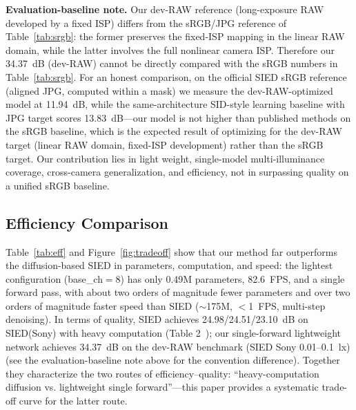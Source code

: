 \documentclass[remotesensing,article,accept,moreauthors]{Definitions/mdpi}
\begin{document}
\textbf{Evaluation-baseline note.} Our dev-RAW reference (long-exposure RAW developed by a fixed ISP) differs from the sRGB/JPG reference of Table~\ref{tab:srgb}: the former preserves the fixed-ISP mapping in the linear RAW domain, while the latter involves the full nonlinear camera ISP. Therefore our 34.37~dB (dev-RAW) cannot be directly compared with the sRGB numbers in Table~\ref{tab:srgb}. For an honest comparison, on the official SIED sRGB reference (aligned JPG, computed within a mask) we measure the dev-RAW-optimized model at 11.94~dB, while the same-architecture SID-style learning baseline with JPG target scores 13.83~dB---our model is not higher than published methods on the sRGB baseline, which is the expected result of optimizing for the dev-RAW target (linear RAW domain, fixed-ISP development) rather than the sRGB target. Our contribution lies in light weight, single-model multi-illuminance coverage, cross-camera generalization, and efficiency, not in surpassing quality on a unified sRGB baseline.

\subsection{Efficiency Comparison}

Table~\ref{tab:eff} and Figure~\ref{fig:tradeoff} show that our method far outperforms the diffusion-based SIED in parameters, computation, and speed: the lightest configuration (base\_ch$=$8) has only 0.49M parameters, 82.6~FPS, and a single forward pass, with about two orders of magnitude fewer parameters and over two orders of magnitude faster speed than SIED ($\sim$175M, $<$1~FPS, multi-step denoising). In terms of quality, SIED achieves 24.98/24.51/23.10~dB on SIED(Sony) with heavy computation (Table 2~\citep{jiang2025sied}); our single-forward lightweight network achieves 34.37~dB on the dev-RAW benchmark (SIED Sony 0.01--0.1~lx) (see the evaluation-baseline note above for the convention difference). Together they characterize the two routes of efficiency--quality: ``heavy-computation diffusion vs. lightweight single forward''---this paper provides a systematic trade-off curve for the latter route.
\end{document}
